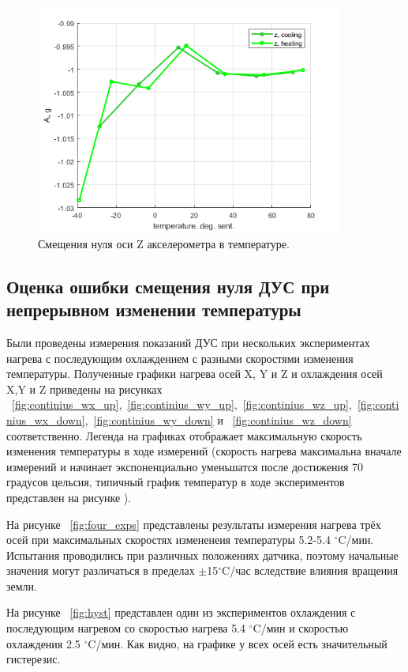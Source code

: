 \documentclass[a4paper,12pt]{article}
\begin{document}
\begin{figure}[hp!]
\centering
\includegraphics[width=0.9\textwidth]{Az_accel.png} 
\caption{\label{fig:Az_accel} Смещения нуля оси Z акселерометра в температуре.}
\end{figure}

\subsection{Оценка ошибки смещения нуля ДУС при непрерывном изменении температуры}
Были проведены измерения показаний ДУС при нескольких экспериментах нагрева с последующим охлаждением с разными скоростями изменения температуры. Полученные графики нагрева осей X, Y и Z и охлаждения осей X,Y и Z приведены на рисунках ~\ref{fig:continius_wx_up},~\ref{fig:continius_wy_up},~\ref{fig:continius_wz_up},~\ref{fig:continius_wx_down},~\ref{fig:continius_wy_down} и ~\ref{fig:continius_wz_down} соответственно. Легенда на графиках отображает максимальную скорость изменения температуры в ходе измерений (скорость нагрева максимальна вначале измерений и начинает экспоненциально уменьшатся после достижения 70 градусов цельсия, типичный график температур в ходе экспериментов представлен на рисунке ).

На рисунке ~\ref{fig:four_exps} представлены результаты измерения нагрева трёх осей при максимальных скоростях измененеия температуры 5.2-5.4 $^{\circ}$C/мин. Испытания проводились при различных положениях датчика, поэтому начальные значения могут различаться в пределах $\pm$15$^{\circ}$C/час вследствие влияния вращения земли.

На рисунке ~\ref{fig:hyst} представлен один из экспериментов охлаждения с последующим нагревом со скоростью нагрева  5.4 $^{\circ}$C/мин и скоростью охлаждения 2.5 $^{\circ}$C/мин. Как видно, на графике у всех осей есть значительный гистерезис. 
\end{document}
